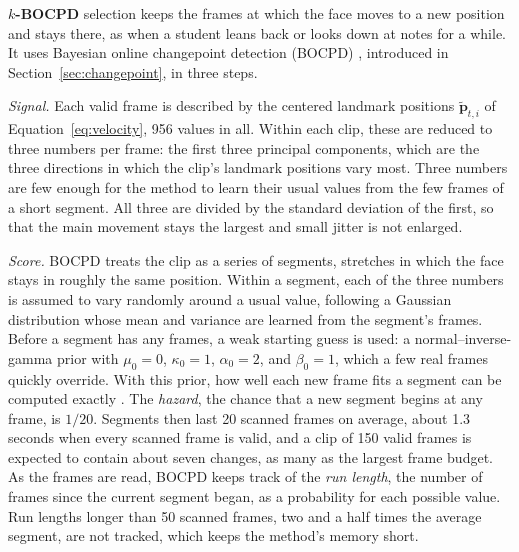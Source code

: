 \textbf{$k$-BOCPD} selection keeps the frames at which the face moves to a new position and stays there, as when a student leans back or looks down at notes for a while. It uses Bayesian online changepoint detection (BOCPD) \cite{adams2007}, introduced in Section~\ref{sec:changepoint}, in three steps.

\emph{Signal.} Each valid frame is described by the centered landmark positions $\tilde{\mathbf{p}}_{t,i}$ of Equation~\ref{eq:velocity}, 956 values in all. Within each clip, these are reduced to three numbers per frame: the first three principal components, which are the three directions in which the clip's landmark positions vary most. Three numbers are few enough for the method to learn their usual values from the few frames of a short segment. All three are divided by the standard deviation of the first, so that the main movement stays the largest and small jitter is not enlarged.

\emph{Score.} BOCPD treats the clip as a series of segments, stretches in which the face stays in roughly the same position. Within a segment, each of the three numbers is assumed to vary randomly around a usual value, following a Gaussian distribution whose mean and variance are learned from the segment's frames. Before a segment has any frames, a weak starting guess is used: a normal--inverse-gamma prior with $\mu_0 = 0$, $\kappa_0 = 1$, $\alpha_0 = 2$, and $\beta_0 = 1$, which a few real frames quickly override. With this prior, how well each new frame fits a segment can be computed exactly \cite{adams2007}. The \emph{hazard}, the chance that a new segment begins at any frame, is $1/20$. Segments then last 20 scanned frames on average, about 1.3 seconds when every scanned frame is valid, and a clip of 150 valid frames is expected to contain about seven changes, as many as the largest frame budget. As the frames are read, BOCPD keeps track of the \emph{run length}, the number of frames since the current segment began, as a probability for each possible value. Run lengths longer than 50 scanned frames, two and a half times the average segment, are not tracked, which keeps the method's memory short.

